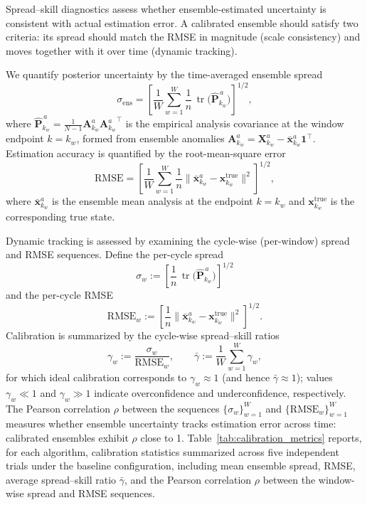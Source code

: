 \documentclass[11pt,a4paper]{article}
\DeclareMathOperator{\tr}{tr}
\begin{document}
Spread--skill diagnostics assess whether ensemble-estimated uncertainty is consistent with actual estimation error. A calibrated ensemble should satisfy two criteria: its spread should match the RMSE in magnitude (scale consistency) and moves together with it over time (dynamic tracking).

We quantify posterior uncertainty by the time-averaged ensemble spread
\begin{equation}
\sigma_{\mathrm{ens}}
=
\left[
\frac{1}{W}\sum_{w=1}^W \frac{1}{n}\,\tr\!\bigl(\widehat{\mathbf{P}}_{k_w}^{\,a}\bigr)
\right]^{1/2},
\label{eq:spread_framework}
\end{equation}
where $\widehat{\mathbf{P}}_{k_w}^{\,a} = \frac{1}{N-1}{\mathbf{A}^{a}_{k_w}}{\mathbf{A}^{a}_{k_w}}^{\!\top}$ is the empirical analysis covariance at the window endpoint $k=k_w$, formed from ensemble anomalies $\mathbf{A}^{a}_{k_w} = \mathbf{X}_{k_w}^a - \bar{\mathbf{x}}_{k_w}^a\mathbf{1}^{\top}$. Estimation accuracy is quantified by the root-mean-square error
\begin{equation}
\mathrm{RMSE}
=
\left[
\frac{1}{W}\sum_{w=1}^W \frac{1}{n}\|\bar{\mathbf{x}}_{k_w}^a - \mathbf{x}_{k_w}^{\mathrm{true}}\|^2
\right]^{1/2},
\label{eq:rmse_framework}
\end{equation}
where $\bar{\mathbf{x}}_{k_w}^a$ is the ensemble mean analysis at the endpoint $k=k_w$ and $\mathbf{x}_{k_w}^{\mathrm{true}}$ is the corresponding true state.

Dynamic tracking is assessed by examining the cycle-wise (per-window) spread and RMSE sequences. Define the per-cycle spread
\begin{equation}
\sigma_w := \left[\frac{1}{n}\,\tr\!\bigl(\widehat{\mathbf{P}}_{k_w}^{\,a}\bigr)\right]^{1/2}
\end{equation}
and the per-cycle RMSE
\begin{equation}
\mathrm{RMSE}_w := \left[\frac{1}{n}\|\bar{\mathbf{x}}_{k_w}^a - \mathbf{x}_{k_w}^{\mathrm{true}}\|^2\right]^{1/2}.
\end{equation}
Calibration is summarized by the cycle-wise spread--skill ratios
\begin{equation}
\gamma_w := \frac{\sigma_w}{\mathrm{RMSE}_w},
\qquad
\bar{\gamma} := \frac{1}{W}\sum_{w=1}^W \gamma_w,
\label{eq:gamma_framework}
\end{equation}
for which ideal calibration corresponds to $\gamma_w \approx 1$ (and hence $\bar{\gamma}\approx 1$); values $\gamma_w \ll 1$ and $\gamma_w \gg 1$ indicate overconfidence and underconfidence, respectively.
The Pearson correlation $\rho$ between the sequences $\{\sigma_w\}_{w=1}^W$ and $\{\mathrm{RMSE}_w\}_{w=1}^W$ measures whether ensemble uncertainty tracks estimation error across time: calibrated ensembles exhibit $\rho$ close to 1. Table~\ref{tab:calibration_metrics} reports, for each algorithm, calibration statistics summarized across five independent trials under the baseline configuration, including mean ensemble spread, RMSE, average spread--skill ratio $\bar{\gamma}$, and the Pearson correlation $\rho$ between the window-wise spread and RMSE sequences.
\end{document}

